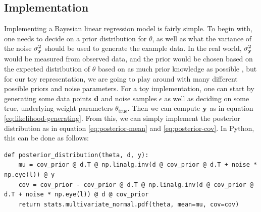 \subsection{Implementation}
Implementing a Bayesian linear regression model is fairly simple.
To begin with, one needs to decide on a prior distribution for $\theta$, as well as what the variance of the noise $\sigma^2_{\mathbf{y}}$ should be used to generate the example data.
In the real world, $\sigma^2_{\mathbf{y}}$ would be measured from observed data, and the prior would be chosen based on the expected distribution of $\theta$ based on as much prior knowledge as possible
, but for our toy representation, we are going to play around with many different possible priors and noise parameters.
For a toy implementation, one can start by generating some data points $\mathbf{d}$ and noise samples $\epsilon$ as well as deciding on some true, underlying weight parameters $\theta_{\textrm{true}}$.
Then we can compute $\mathbf{y}$ as in equation \ref{eq:likelihood-generating}. 
From this, we can simply implement the posterior distribution as in equation \ref{eq:posterior-mean} and \ref{eq:posterior-cov}.
In Python, this can be done as follows:
\begin{verbatim}
def posterior_distribution(theta, d, y):
    mu = cov_prior @ d.T @ np.linalg.inv(d @ cov_prior @ d.T + noise * np.eye(l)) @ y
    cov = cov_prior - cov_prior @ d.T @ np.linalg.inv(d @ cov_prior @ d.T + noise * np.eye(l)) @ d @ cov_prior
    return stats.multivariate_normal.pdf(theta, mean=mu, cov=cov)
\end{verbatim}

